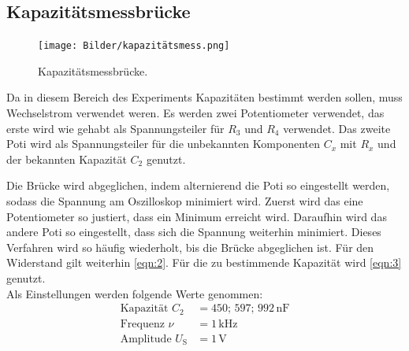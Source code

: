 \subsection{Kapazitätsmessbrücke}
\begin{figure}[H]
    \centering
        \centering
        \texttt{[image: Bilder/kapazitätsmess.png]}
        \caption{Kapazitätsmessbrücke. \cite{anleitung}}
    \hfill
    \label{fig:f3}
\end{figure}
\noindent Da in diesem Bereich des Experiments Kapazitäten bestimmt werden sollen, 
muss Wechselstrom verwendet weren. Es werden zwei Potentiometer verwendet, 
das erste wird wie gehabt als Spannungsteiler für $R_3$ und $R_4$ verwendet. Das 
zweite Poti wird als Spannungsteiler für die unbekannten Komponenten $C_x$ mit 
$R_x$ und der bekannten Kapazität $C_2$ genutzt.
\par\vspace{0.5em}
\noindent Die Brücke wird abgeglichen, indem alternierend die Poti so eingestellt werden, 
sodass die Spannung am Oszilloskop minimiert wird. Zuerst wird das eine Potentiometer 
so justiert, dass ein Minimum erreicht wird. Daraufhin wird das andere Poti so 
eingestellt, dass sich die Spannung weiterhin minimiert.
Dieses Verfahren wird so häufig wiederholt, bis die Brücke abgeglichen ist.
Für den Widerstand gilt weiterhin \autoref{eqn:2}.
Für die zu bestimmende Kapazität wird \autoref{eqn:3} genutzt.
\\
\noindent Als Einstellungen werden folgende Werte genommen:
\begin{align*}
    \text{Kapazität } C_2 &= 450;\, 597;\, 992\,\unit{\nano\farad} \\
    \text{Frequenz } \nu &= 1\,\unit{\kilo\hertz} \\
    \text{Amplitude } U_{\text{S}} &= 1\,\unit{\volt} \\
\end{align*}

